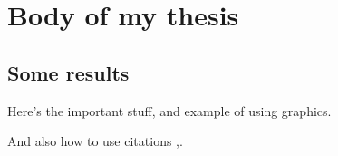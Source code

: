 \chapter{Body of my thesis}
\label{chapter:body}
\thispagestyle{myheadings}

\graphicspath{{2_Body/Figures/}}

\section{Some results}
\label{sec:results}

Here's the important stuff, and example of using graphics.


And also how to use citations \cite{lamport1985:latex},\cite{Debr01}.
